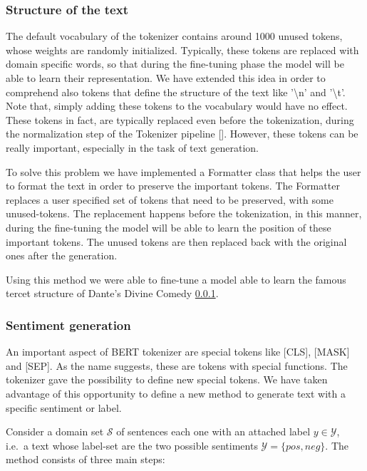 \documentclass[10pt,twocolumn,letterpaper]{article}
\begin{document}
\subsubsection{Structure of the text}
The default vocabulary of the tokenizer contains around 1000 unused tokens, whose weights are randomly initialized.
Typically, these tokens are replaced with domain specific words, so that during the fine-tuning phase
the model will be able to learn their representation.
We have extended this idea in order to comprehend also tokens that define the structure of the text like
'\textbackslash n' and '\textbackslash t'.
Note that, simply adding these tokens to the vocabulary would have no effect.
These tokens in fact, are typically replaced even before the tokenization, during the normalization step of the Tokenizer pipeline [].
However, these tokens can be really important, especially in the task of text generation.

To solve this problem we have implemented a Formatter class that helps the user to format the text in order
to preserve the important tokens.
The Formatter replaces a user specified set of tokens that need to be preserved, with some unused-tokens.
The replacement happens before the tokenization, in this manner, during the fine-tuning the model will be able to learn
the position of these important tokens.
The unused tokens are then replaced back with the original ones after the generation.

Using this method we were able to fine-tune a model able to learn the famous tercet structure of Dante's Divine Comedy \ref{}.

\subsubsection{Sentiment generation}
\label{sentiment}
An important aspect of BERT tokenizer are special tokens like [CLS], [MASK] and [SEP].
As the name suggests, these are tokens with special functions.
The tokenizer gave the possibility to define new special tokens.
We have taken advantage of this opportunity to define a new method to generate text with a specific sentiment or label.

Consider a domain set $\mathcal S$ of sentences each one with an attached label $y\in \mathcal Y$, i.e.\ a text whose label-set are the two possible sentiments $\mathcal Y =\{pos, neg\}$.
The method consists of three main steps:
\end{document}
